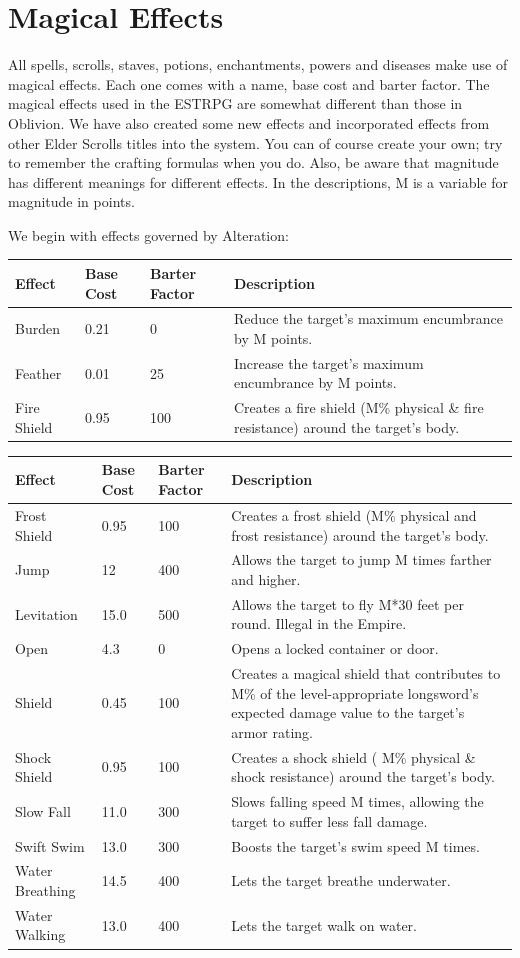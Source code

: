 \documentclass[12pt]{book}
\begin{document}
\chapter{Magical Effects}
All spells, scrolls, staves, potions, enchantments, powers and diseases make use of magical effects. Each one comes with a name, base cost and barter factor. The magical effects used in the ESTRPG are somewhat different than those in Oblivion. We have also created some new effects and incorporated effects from other Elder Scrolls titles into the system. You can of course create your own; try to remember the crafting formulas when you do. Also, be aware that magnitude has different meanings for different effects. In the descriptions, M is a variable for magnitude in points.

We begin with effects governed by Alteration:\\

\begin{tabular}{p{}|p{}|p{}|p{}}
Effect & Base Cost & Barter Factor & Description\\ \hline
Burden & 0.21 & 0 & Reduce the target's maximum encumbrance by M points.\\ \hline
Feather & 0.01 & 25 & Increase the target's maximum encumbrance by M points.\\ \hline
Fire Shield & 0.95 & 100 & Creates a fire shield (M\% physical \& fire resistance) around the target's body.\\
\end{tabular}

\begin{tabular}{p{}|p{}|p{}|p{}}
Effect & Base Cost & Barter Factor & Description\\ \hline
Frost Shield & 0.95 & 100 & Creates a frost shield (M\% physical and frost resistance) around the target's body.\\ \hline
Jump & 12 & 400 & Allows the target to jump M times farther and higher.\\ \hline
Levitation & 15.0 & 500 & Allows the target to fly M*30 feet per round. Illegal in the Empire.\\ \hline
Open & 4.3 & 0 & Opens a locked container or door.\\ \hline
Shield & 0.45 & 100 & Creates a magical shield that contributes to M\% of the level-appropriate longsword's expected damage value to the target's armor rating.\\ \hline
Shock Shield & 0.95 & 100 & Creates a shock shield ( M\% physical \& shock resistance) around the target's body.\\ \hline
Slow Fall & 11.0 & 300 & Slows falling speed M times, allowing the target to suffer less fall damage.\\ \hline
Swift Swim & 13.0 & 300 & Boosts the target's swim speed M times.\\ \hline
Water Breathing & 14.5 & 400 & Lets the target breathe underwater.\\ \hline
Water Walking & 13.0 & 400 & Lets the target walk on water.\\
\end{tabular}
\end{document}
